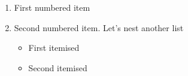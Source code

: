 \begin{enumerate}
    \item First numbered item
    \item Second numbered item. Let's nest another list
    \begin{itemize}
        \item First itemised
        \item Second itemised
    \end{itemize}
\end{enumerate}